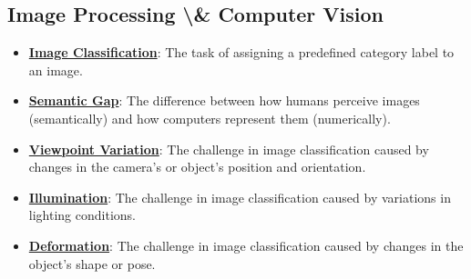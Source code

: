\documentclass{article}%
\begin{document}
\subsection{Image Processing \textbackslash{}\& Computer Vision}%
\label{subsec:ImageProcessingComputerVision}%
\begin{itemize}[leftmargin=*]%
\item \href{https://purdue.brightspace.com/d2l/common/assets/pdfjs-d2l-dist/1.0.14-legacy/web/viewer.html?file=%2Fcontent%2Fenforced%2F1095467-wl.202510.CS.24300.001%2F07L2-Vision.pdf%3Fou%3D1095467&lang=en-us&container=d2l-fileviewer-rendered-pdf&fullscreen=d2l-fileviewer-rendered-pdf-dialog&height=667#page=3}{\textbf{Image Classification}}: The task of assigning a predefined category label to an image.%
\item \href{https://purdue.brightspace.com/d2l/common/assets/pdfjs-d2l-dist/1.0.14-legacy/web/viewer.html?file=%2Fcontent%2Fenforced%2F1095467-wl.202510.CS.24300.001%2F07L2-Vision.pdf%3Fou%3D1095467&lang=en-us&container=d2l-fileviewer-rendered-pdf&fullscreen=d2l-fileviewer-rendered-pdf-dialog&height=667#page=4}{\textbf{Semantic Gap}}: The difference between how humans perceive images (semantically) and how computers represent them (numerically).%
\item \href{https://purdue.brightspace.com/d2l/common/assets/pdfjs-d2l-dist/1.0.14-legacy/web/viewer.html?file=%2Fcontent%2Fenforced%2F1095467-wl.202510.CS.24300.001%2F07L2-Vision.pdf%3Fou%3D1095467&lang=en-us&container=d2l-fileviewer-rendered-pdf&fullscreen=d2l-fileviewer-rendered-pdf-dialog&height=667#page=6}{\textbf{Viewpoint Variation}}: The challenge in image classification caused by changes in the camera's or object's position and orientation.%
\item \href{https://purdue.brightspace.com/d2l/common/assets/pdfjs-d2l-dist/1.0.14-legacy/web/viewer.html?file=%2Fcontent%2Fenforced%2F1095467-wl.202510.CS.24300.001%2F07L2-Vision.pdf%3Fou%3D1095467&lang=en-us&container=d2l-fileviewer-rendered-pdf&fullscreen=d2l-fileviewer-rendered-pdf-dialog&height=667#page=7}{\textbf{Illumination}}: The challenge in image classification caused by variations in lighting conditions.%
\item \href{https://purdue.brightspace.com/d2l/common/assets/pdfjs-d2l-dist/1.0.14-legacy/web/viewer.html?file=%2Fcontent%2Fenforced%2F1095467-wl.202510.CS.24300.001%2F07L2-Vision.pdf%3Fou%3D1095467&lang=en-us&container=d2l-fileviewer-rendered-pdf&fullscreen=d2l-fileviewer-rendered-pdf-dialog&height=667#page=8}{\textbf{Deformation}}: The challenge in image classification caused by changes in the object's shape or pose.%

\end{itemize}
\end{document}
